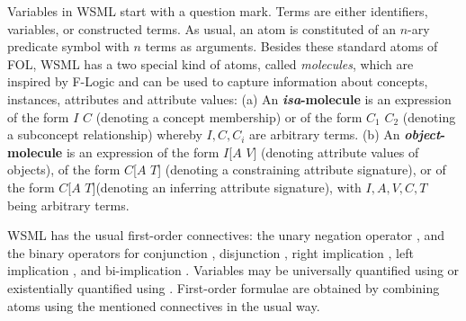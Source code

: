 Variables in WSML start with a question mark.
Terms are either identifiers, variables, or constructed terms. As usual, an
atom is constituted of an $n$-ary predicate symbol with $n$ terms as
arguments. Besides these standard atoms of FOL, WSML has a two special kind of
atoms, called \emph{molecules}, which are inspired by F-Logic and can be used
to capture information about concepts, instances, attributes and attribute
values:
(a) An {\bfseries \emph{isa}-molecule} is an expression of
  the form {\small $I$  $C$} (denoting a concept membership)
  or of the form {\small $C_1$  $C_2$}
  (denoting a subconcept relationship)
  whereby {\small$I,C,C_i$} are arbitrary
  terms.
(b) An {\bfseries  \emph{object}-molecule} is an expression of the form
   {\small $I$[$A$  $V$]} (denoting attribute values of objects),
   of the form {\small $C$[$A$  $T$]} (denoting a
  constraining attribute signature), or of the form
  {\small $C$[$A$  $T$]}(denoting an inferring attribute signature), with
  {\small $I,A,V,C,T$} being arbitrary terms.

WSML has the usual first-order connectives: the unary negation
operator , and the binary operators for conjunction
, disjunction , right implication
, left implication , and bi-implication
. Variables may be universally
quantified using  or existentially quantified using
. First-order formulae are obtained by combining atoms
using the mentioned connectives in the usual way.
%

